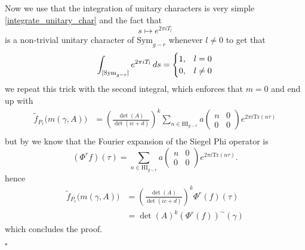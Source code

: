 Now we use that the integration of unitary characters is very simple \ref{integrate_unitary_char} and the fact that 
\[s\mapsto  e^{2\pi iT_l} \]
is a non-trivial unitary character of \(\mathrm{Sym}_{g-r}\) whenever \(l\neq 0\) to get that 
\[\int^{}_{[\mathrm{Sym}_{g-r}]}  e^{2\pi iT_l}  \,ds = \begin{cases}
    1, & l=0 \\
    0, & l\neq 0
\end{cases}\]
we repeat this trick with the second integral, which enforces that \(m = 0\) and end up with 
\begin{align*}
    \tilde f_{P_r}\bigl(m(\gamma, A)\bigr)
     &=\left(\frac{\det(A)}{\det(ic + d)}\right)^{k} \sum_{n\in\mathrm{HI}_{g-r}} a\begin{pmatrix} n & 0\\ 0 & 0 \end{pmatrix}e^{2\pi i \mathrm{Tr} (n\tau)}\\
\end{align*}
but by \cite[3.5]{bruinier123ModularForms2008} we know that the Fourier expansion of the Siegel Phi operator is 
\[(\Phi^{r} f)(\tau) = \sum_{n\in\mathrm{HI}_{g-r}} a\begin{pmatrix} n & 0\\ 0 & 0 \end{pmatrix} e^{2\pi i\mathrm{Tr}(n \tau)}.\]
hence 
\begin{align*}
    \tilde f_{P_r}\bigl(m(\gamma, A)\bigr)
     &=\left(\frac{\det(A)}{\det(ic + d)}\right)^{k} \Phi^r(f)(\tau)\\
     &= \det(A)^k (\Phi^r(f))^{\sim}(\gamma)
\end{align*}
which concludes the proof.
\begin{FlushRight}
     \(\square\)
\end{FlushRight}